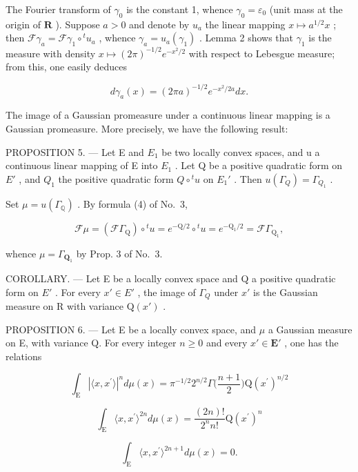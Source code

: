 The Fourier transform of \(\gamma_0\) is the constant 1, whence \(\gamma_0 = \varepsilon_0\) (unit mass at the origin of \(\mathbf{R}\) ). Suppose \(a > 0\) and denote by \(u_a\) the linear mapping \(x \mapsto a^{1/2}x\) ; then \(\mathcal{F}\gamma_a = \mathcal{F}\gamma_1 \circ {}^t u_a\) , whence \(\gamma_a = u_a(\gamma_1)\) . Lemma 2 shows that \(\gamma_1\) is the measure with density \(x \mapsto (2\pi)^{-1/2} e^{-x^2/2}\) with respect to Lebesgue measure; from this, one easily deduces

\[
d \gamma_ {a} (x) = (2 \pi a) ^ {- 1 / 2} e ^ {- x ^ {2} / 2 a} d x.\tag{15}
\]

The image of a Gaussian promeasure under a continuous linear mapping is a Gaussian promeasure. More precisely, we have the following result:

PROPOSITION 5. --- Let E and \(E_{1}\) be two locally convex spaces, and u a continuous linear mapping of E into \(E_{1}\) . Let Q be a positive quadratic form on \(E'\) , and \(Q_{1}\) the positive quadratic form \(Q \circ {}^{t}u\) on \(E_{1}'\) . Then \(u(\Gamma_{Q}) = \Gamma_{Q_{1}}\) .

Set \(\mu = u(\Gamma_{\mathbb{Q}})\) . By formula (4) of No.~3,

\[
\mathcal {F} \mu = \left(\mathcal {F} \Gamma_ {\mathrm{Q}}\right) \circ {} ^ {t} u = e ^ {- \mathrm{Q} / 2} \circ {} ^ {t} u = e ^ {- \mathrm{Q} _ {1} / 2} = \mathcal {F} \Gamma_ {\mathrm{Q} _ {1}},
\]

whence \(\mu = \Gamma_{\mathbf{Q}_1}\) by Prop. 3 of No.~3.

COROLLARY. --- Let E be a locally convex space and Q a positive quadratic form on \(E'\) . For every \(x' \in E'\) , the image of \(\Gamma_{Q}\) under \(x'\) is the Gaussian measure on R with variance \(\mathrm{Q}(x')\) .

PROPOSITION 6. --- Let E be a locally convex space, and \(\mu\) a Gaussian measure on E, with variance Q. For every integer \(n \geqslant 0\) and every \(x' \in \mathbf{E}'\) , one has the relations

\[
\int_ {\mathrm{E}} | \langle x, x ^ {\prime} \rangle | ^ {n} d \mu (x) = \pi^ {- 1 / 2} 2 ^ {n / 2} \Gamma \Big (\frac {n + 1}{2} \Big) \mathrm{Q} (x ^ {\prime}) ^ {n / 2}\tag{16}
\]

\[
\int_ {\mathrm{E}} \langle x, x ^ {\prime} \rangle^ {2 n} d \mu (x) = \frac {(2 n) !}{2 ^ {n} n !} \mathrm{Q} (x ^ {\prime}) ^ {n}\tag{17}
\]

\[
\int_ {\mathrm{E}} \langle x, x ^ {\prime} \rangle^ {2 n + 1} d \mu (x) = 0.\tag{18}
\]

